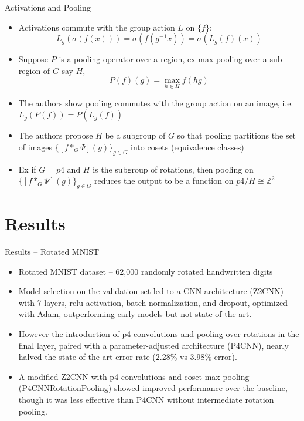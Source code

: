 \documentclass{beamer}
\newcommand{\Z}{\mathbb{Z}}
\begin{document}
\begin{frame}{Activations and Pooling}
    \begin{itemize}
        \item Activations commute with the group action $L$ on $\{f\}$: 
        $$L_g(\sigma(f(x))) = \sigma(f(g^{-1}x)) = \sigma(L_g(f)(x))$$
        \item Suppose $P$ is a pooling operator over a region, ex max pooling over a sub region of $G$ say $H$, $$P(f)(g) = \max_{h \in H} f(hg)$$
        \item The authors show pooling commutes with the group action on an image, i.e. $L_g(P(f)) = P(L_g(f))$
        \item The authors propose $H$ be a subgroup of $G$ so that pooling partitions the set of images $\{[f *_G \Psi](g)\}_{g\in G}$ into cosets (equivalence classes)
        \item Ex if $G = p4$ and $H$ is the subgroup of rotations, then pooling on $\{[f *_G \Psi](g)\}_{g\in G}$ reduces the output to be a function on $p4 / H \cong \Z^2$  
    \end{itemize}
\end{frame}

\section{Results}

\begin{frame}{Results -- Rotated MNIST}
    \begin{itemize}
        \item Rotated MNIST dataset -- 62,000 randomly rotated handwritten digits
        \item Model selection on the validation set led to a CNN architecture (Z2CNN) with 7 layers, relu activation, batch normalization, and dropout, optimized with Adam, outperforming early models but not state of the art.
        \item However the introduction of p4-convolutions and pooling over rotations in the final layer, paired with a parameter-adjusted architecture (P4CNN), nearly halved the state-of-the-art error rate (2.28\% vs 3.98\% error).
        \item A modified Z2CNN with p4-convolutions and coset max-pooling (P4CNNRotationPooling) showed improved performance over the baseline, though it was less effective than P4CNN without intermediate rotation pooling.
      \end{itemize}
\end{frame}
\end{document}
